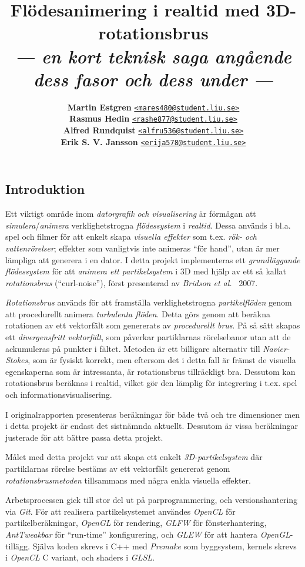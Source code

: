 \documentclass[a4paper]{article}
\date{\vspace{-0.5ex}} %
\title{\vspace{-2.2cm}\textbf{Flödesanimering i realtid med 3D-rotationsbrus}\\
       \Large{\textit{--- en kort teknisk saga angående dess fasor och dess under ---}}\vspace{-0.25cm}}
\author{{\textbf{Martin Estgren}}\;\;\;\;\;\; {\href{mailto:mares480@student.liu.se}{\texttt{<mares480@student.liu.se>}}}\\
        {\textbf{Rasmus Hedin}}\;\;\;\;\;\;\;\; {\href{mailto:rashe877@student.liu.se}{\texttt{<rashe877@student.liu.se>}}}\\
        {\textbf{Alfred Rundquist}}\;\;\; {\href{mailto:alfru536@student.liu.se}{\texttt{<alfru536@student.liu.se>}}}\\
        {\textbf{Erik S. V. Jansson}}\; {\href{mailto:erija578@student.liu.se}{\texttt{<erija578@student.liu.se>}}}}
\begin{document}
    \maketitle
\begin{multicols}{2}

    \section{Introduktion}

    Ett viktigt område inom \emph{datorgrafik och visualisering} är förmågan att \emph{simulera}/\emph{animera} verklighetstrogna \emph{flödessystem} i \emph{realtid}. Dessa används i bl.a. spel och filmer för att enkelt skapa \emph{visuella effekter} som t.ex. \emph{rök- och vattenrörelser}; effekter som vanligtvis inte animeras ``för hand'', utan är mer lämpliga att generera i en dator. I detta projekt implementeras ett \emph{grundläggande flödessystem} för att \emph{animera ett partikelsystem} i 3D med hjälp av ett så kallat \emph{rotationsbrus} (``curl-noise''), först presenterad av \emph{Bridson et al.}~\cite{bridson2007curl} 2007.

    \textit{Rotationsbrus} används för att framställa verklighetstrogna \emph{partikelflöden} genom att procedurellt animera \emph{turbulenta flöden}. Detta görs genom att beräkna rotationen av ett vektorfält som genererats av \emph{procedurellt brus}. På så sätt skapas ett \emph{divergensfritt vektorfält}, som påverkar partiklarnas rörelsebanor utan att de ackumuleras på punkter i fältet. Metoden är ett billigare alternativ till \emph{Navier-Stokes}, som är fysiskt korrekt, men eftersom det i detta fall är främst de visuella egenskaperna som är intressanta, är rotationsbrus tillräckligt bra. Dessutom kan rotationsbrus beräknas i realtid, vilket gör den lämplig för integrering i t.ex. spel och informationsvisualisering.

	I originalrapporten presenteras beräkningar för både två och tre dimensioner men i detta projekt är endast det sistnämnda aktuellt. Dessutom är vissa beräkningar justerade för att bättre passa detta projekt.
	
    Målet med detta projekt var att skapa ett enkelt \emph{3D-partikelsystem} där partiklarnas rörelse bestäms av ett vektorfält genererat genom \emph{rotationsbrusmetoden} tillsammans med några enkla visuella effekter.

    Arbetsprocessen gick till stor del ut på parprogrammering, och versionshantering via \textit{Git}. För att realisera partikelsystemet användes \textit{OpenCL} för partikelberäkningar, \textit{OpenGL} för rendering, \textit{GLFW} för fönsterhantering, \textit{AntTweakbar} för ``run-time'' konfigurering, och \textit{GLEW} för att hantera \textit{OpenGL}-tillägg. Själva koden skrevs i C++ med \emph{Premake} som byggsystem, kernels skrevs i \textit{OpenCL} C variant, och shaders i \textit{GLSL}.


\end{multicols}
\end{document}
